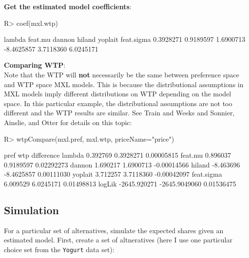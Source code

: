 \documentclass[article]{jss}
\begin{document}
\textbf{Get the estimated model coefficients}:

\begin{CodeChunk}

\begin{CodeInput}
R> coef(mxl.wtp)
\end{CodeInput}

\begin{CodeOutput}
    lambda    feat.mu     dannon     hiland    yoplait feat.sigma 
 0.3928271  0.9189597  1.6900713 -8.4625857  3.7118360  6.0245171 
\end{CodeOutput}
\end{CodeChunk}

\textbf{Comparing WTP}:\\
Note that the WTP will \textbf{not} necessarily be the same between
preference space and WTP space MXL models. This is because the
distributional assumptions in MXL models imply different distributions
on WTP depending on the model space. In this particular example, the
distributional assumptions are not too different and the WTP results are
similar. See Train and Weeks \citeyearpar{Train2005} and Sonnier,
Ainslie, and Otter \citeyearpar{Sonnier2007} for details on this topic:

\begin{CodeChunk}

\begin{CodeInput}
R> wtpCompare(mxl.pref, mxl.wtp, priceName="price")
\end{CodeInput}

\begin{CodeOutput}
                   pref           wtp  difference
lambda         0.392769     0.3928271  0.00005815
feat.mu        0.896037     0.9189597  0.02292273
dannon         1.690217     1.6900713 -0.00014566
hiland        -8.463696    -8.4625857  0.00111030
yoplait        3.712257     3.7118360 -0.00042097
feat.sigma     6.009529     6.0245171  0.01498813
logLik     -2645.920271 -2645.9049060  0.01536475
\end{CodeOutput}
\end{CodeChunk}

\newpage

\hypertarget{simulation-1}{%
\subsection{Simulation}\label{simulation-1}}

For a particular set of alternatives, simulate the expected shares given
an estimated model. First, create a set of altneratives (here I use one
particular choice set from the \texttt{Yogurt} data set):
\end{document}
